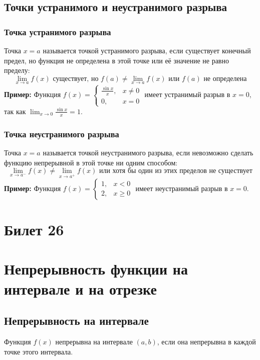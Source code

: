 \documentclass{article}
\begin{document}
\subsection*{Точки устранимого и неустранимого разрыва}

\subsubsection*{Точка устранимого разрыва}
Точка $x = a$ называется точкой устранимого разрыва, если существует конечный предел, но функция не определена в этой точке или её значение не равно пределу:
\[
\lim_{x \to a} f(x) \text{ существует, но } f(a) \neq \lim_{x \to a} f(x) \text{ или } f(a) \text{ не определена}
\]
\textbf{Пример:} Функция $f(x) = \begin{cases} 
\frac{\sin x}{x}, & x \neq 0 \\
0, & x = 0 
\end{cases}$ имеет устранимый разрыв в $x = 0$, так как $\lim_{x \to 0} \frac{\sin x}{x} = 1$.

\subsubsection*{Точка неустранимого разрыва}
Точка $x = a$ называется точкой неустранимого разрыва, если невозможно сделать функцию непрерывной в этой точке ни одним способом:
\[
\lim_{x \to a^-} f(x) \neq \lim_{x \to a^+} f(x) \text{ или хотя бы один из этих пределов не существует}
\]
\textbf{Пример:} Функция $f(x) = \begin{cases} 
1, & x < 0 \\
2, & x \geq 0 
\end{cases}$ имеет неустранимый разрыв в $x = 0$.

\section{Билет 26}

\section*{Непрерывность функции на интервале и на отрезке}

\subsection*{Непрерывность на интервале}
Функция \( f(x) \) непрерывна на интервале \( (a, b) \), если она непрерывна в каждой точке этого интервала.
\end{document}
